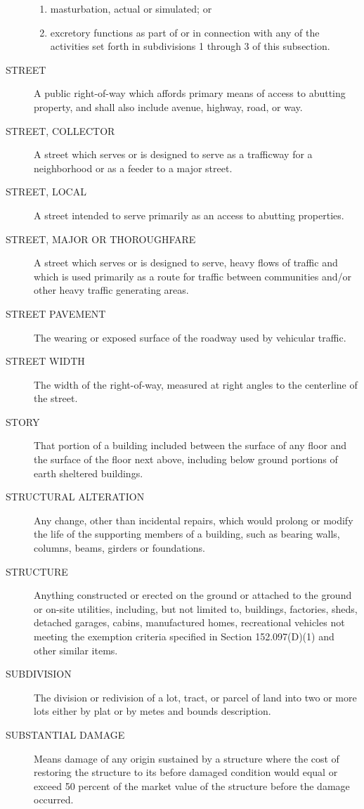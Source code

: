 \begin{description}
\begin{enumerate}[{\indent}1)]
            \item masturbation, actual or simulated; or
            \item excretory functions as part of or in connection with any of the activities set forth in subdivisions 1 through 3 of this subsection.
        \end{enumerate}
    \item[STREET] A public right-of-way which affords primary means of access to abutting property, and shall also include avenue, highway, road, or way.
    \item[STREET, COLLECTOR] A street which serves or is designed to serve as a trafficway for a neighborhood or as a feeder to a major street.
    \item[STREET, LOCAL] A street intended to serve primarily as an access to abutting properties.
    \item[STREET, MAJOR OR THOROUGHFARE] A street which serves or is designed to serve, heavy flows of traffic and which is used primarily as a route for traffic between communities and/or other heavy traffic generating areas.
    \item[STREET PAVEMENT]The wearing or exposed surface of the roadway used by vehicular traffic.
    \item[STREET WIDTH] The width of the right-of-way, measured at right angles to the centerline of the street.
    \item[STORY] That portion of a building included between the surface of any floor and the surface of the floor next above, including below ground portions of earth sheltered buildings.
    \item[STRUCTURAL ALTERATION] Any change, other than incidental repairs, which would prolong or modify the life of the supporting members of a building, such as bearing walls, columns, beams, girders or foundations.
    \item[STRUCTURE] Anything constructed or erected on the ground or attached to the ground or on-site utilities, including, but not limited to, buildings, factories, sheds, detached garages, cabins, manufactured homes, recreational vehicles not meeting the exemption criteria specified in Section 152.097(D)(1) and other similar items.
    \item[SUBDIVISION] The division or redivision of a lot, tract, or parcel of land into two or more lots either by plat or by metes and bounds description.
    \item[SUBSTANTIAL DAMAGE] Means damage of any origin sustained by a structure where the cost of restoring the structure to its before damaged condition would equal or exceed 50 percent of the market value of the structure before the damage occurred.

\end{description}
